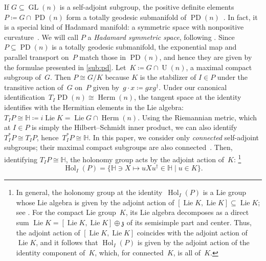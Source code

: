 \documentclass[11pt,letterpaper]{article}
\numberwithin{equation}{section}
\newcommand{\op}{\oplus}
\newcommand{\bbH}{\mathbb{H}}
\DeclareMathOperator{\PD}{PD}
\DeclareMathOperator{\U}{U}
\DeclareMathOperator{\GL}{GL}
\DeclareMathOperator{\Lie}{Lie}
\DeclareMathOperator{\Herm}{Herm}
\DeclareMathOperator{\Hol}{Hol}
\begin{document}
If $G \subseteq \GL(n)$ is a self-adjoint subgroup, the positive definite elements $P \coloneqq G \cap \PD(n)$ form a totally geodesic submanifold of $\PD(n)$~\cite[Thm.~2.12]{Wallach2017}.
In fact, it is a special kind of Hadamard manifold: a symmetric space with nonpositive curvature~\cite{Helgason1978,Hirai2024,HNW2023}.
We will call $P$ a \emph{Hadamard symmetric space}, following \cite{HNW2023}.
Since~$P \subseteq \PD(n)$ is a totally geodesic submanifold, the exponential map and parallel transport on~$P$ match those in $\PD(n)$, and hence they are given by the formulae presented in \cref{sub:pd}.
Let~$K \coloneqq G \cap \U(n)$, a maximal compact subgroup of~$G$.
Then $P \cong G/K$ because $K$ is the stabilizer of $I \in P$ under the transitive action of~$G$ on~$P$ given by~$g \cdot x \coloneqq g x g^\dagger$.
Under our canonical identification~$T_I \PD(n) \cong \Herm(n)$, the tangent space at the identity identifies with the Hermitian elements in the Lie algebra: $T_I P \cong \bbH \coloneqq i\Lie K = \Lie G \cap \Herm(n)$.
Using the Riemannian metric, which at $I \in P$ is simply the Hilbert--Schmidt inner product, we can also identify~$T_I^* P \cong T_I P$, hence~$T_I^* P \cong \bbH$.
In this paper, we consider only \emph{connected} self-adjoint subgroups; their maximal compact subgroups are also connected~\cite[Thm.~2.16]{Wallach2017}.
Then, identifying $T_I P \cong \bbH$, the holonomy group acts by the adjoint action of~$K$:%
\footnote{In general, the holonomy group at the identity~$\Hol_I(P)$ is a Lie group whose Lie algebra is given by the adjoint action of $[\Lie K, \Lie K] \subseteq \Lie K$; see \cite[III~(6.7), IV~Prop.~6.7 and Thm.~6.9]{Sakai1996}.
For the compact Lie group~$K$, its Lie algebra decomposes as a direct sum $\Lie K = [\Lie K, \Lie K] \op \mathfrak z$ of its semisimple part and center.
Thus, the adjoint action of $[\Lie K, \Lie K]$ coincides with the adjoint action of $\Lie K$, and it follows that $\Hol_I(P)$ is given by the adjoint action of the identity component of~$K$, which, for connected~$K$, is all of~$K$.}
\[
    \Hol_I(P) = \{ \bbH \ni X \mapsto u X u^\dagger \in \bbH \mid u \in K \}.
\]
\end{document}
